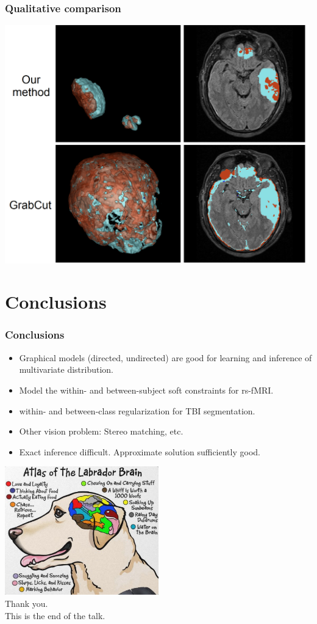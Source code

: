 \documentclass[sansserif, 10pt]{beamer}
\begin{document}
\begin{frame}
\frametitle{Qualitative comparison}
\includegraphics[width=0.99\textwidth]{actlearn_fig/qualitative_comp}
\end{frame}

\section{Conclusions}
\begin{frame}
  \frametitle{Conclusions}
  \begin{block}{}
    \begin{itemize}
    \item Graphical models (directed, undirected) are good for learning and
      inference of multivariate distribution.
    \item Model the within- and between-subject soft constraints for rs-fMRI.
    \item within- and between-class regularization for TBI segmentation.
    \item Other vision problem: Stereo matching, etc.
    \item Exact inference difficult. Approximate solution sufficiently good. 
    \end{itemize}
  \end{block}
\end{frame}

\begin{frame}
  \centering
  \includegraphics[width=0.5\textwidth]{sfig/dog_brain}\\
  \vspace{10pt}  
  Thank you.\\
  This is the end of the talk.
\end{frame}
\end{document}
